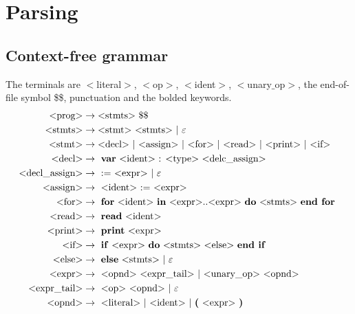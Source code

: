 \documentclass[a4paper]{article}
\begin{document}
\section{Parsing}

\subsection{Context-free grammar}


\newcommand{\cfgvar}[1]{$<$#1$>$}
\newcommand{\cfgrule}[2]{\text{\cfgvar{#1}} &\rightarrow \text{#2}}
\newcommand{\cfgterm}[1]{\textbf{#1}}
The terminals are \cfgvar{literal}, \cfgvar{op}, \cfgvar{ident}, 
\cfgvar{unary$\_$op}, the end-of-file symbol \$\$, punctuation 
and the bolded keywords.
\begin{align*}
  \cfgrule{prog}{\cfgvar{stmts} \$\$} \\
  \cfgrule{stmts}{\cfgvar{stmt} \cfgvar{stmts} $\mid$ $\varepsilon$} \\
  \cfgrule{stmt}{\cfgvar{decl} $\mid$ 
                 \cfgvar{assign} $\mid$
                 \cfgvar{for} $\mid$ 
                 \cfgvar{read} $\mid$ 
                 \cfgvar{print} $\mid$ 
                 \cfgvar{if} } \\
  \cfgrule{decl}{
    \cfgterm{var} \cfgvar{ident} : \cfgvar{type} \cfgvar{delc\_assign}
  } \\
  \cfgrule{decl\_assign}{
     := \cfgvar{expr} $\mid$ $\varepsilon$
  }\\
  \cfgrule{assign}{
    \cfgvar{ident} := \cfgvar{expr}
  } \\
  \cfgrule{for}{
    \cfgterm{for} \cfgvar{ident} \cfgterm{in} 
    \cfgvar{expr}..\cfgvar{expr} \cfgterm{do} \cfgvar{stmts} 
    \cfgterm{end for}
  } \\
  \cfgrule{read}{
    \cfgterm{read} \cfgvar{ident}
  } \\
  \cfgrule{print}{
    \cfgterm{print} \cfgvar{expr}
  } \\ 
  \cfgrule{if}{
    \cfgterm{if} \cfgvar{expr} \cfgterm{do} \cfgvar{stmts}
    \cfgvar{else} \cfgterm{end if}
  } \\
  \cfgrule{else}{
    \cfgterm{else} \cfgvar{stmts} $\mid$ $\varepsilon$
  } \\
  \cfgrule{expr}{ 
    \cfgvar{opnd} \cfgvar{expr$\_$tail} 
    $\mid$ \cfgvar{unary$\_$op} \cfgvar{opnd}
  } \\
  \cfgrule{expr$\_$tail}{
    \cfgvar{op} \cfgvar{opnd} $\mid$ $\varepsilon$
  } \\
  \cfgrule{opnd}{
    \cfgvar{literal} $\mid$ \cfgvar{ident} 
    $\mid$ \cfgterm{(} \cfgvar{expr} \cfgterm{)}
  } \\
\end{align*}
\end{document}
